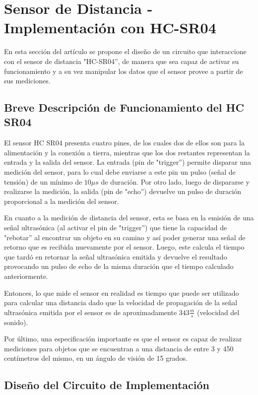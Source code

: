 \section{Sensor de Distancia - Implementación con HC-SR04}

En esta sección del artículo se propone el diseño de un circuito que
interaccione con el sensor de distancia "HC-SR04'', de manera que
sea capaz de activar su funcionamiento y a su vez manipular los datos
que el sensor provee a partir de sus mediciones. 

\subsection{Breve Descripción de Funcionamiento del HC SR04}

El sensor HC SR04 presenta cuatro pines, de los cuales dos de ellos
son para la alimentación y la conexión a tierra, mientras que los
dos restantes representan la entrada y la salida del sensor. La entrada
(pin de "trigger'') permite disparar una medición del sensor, para
lo cual debe enviarse a este pin un pulso (señal de tensión) de un
mínimo de $10\mu s$ de duración. Por otro lado, luego de dispararse
y realizarse la medición, la salida (pin de "echo'') devuelve un
pulso de duración proporcional a la medición del sensor.

En cuanto a la medición de distancia del sensor, esta se basa en la
emisión de una señal ultrasónica (al activar el pin de "trigger'')
que tiene la capacidad de "rebotar'' al encontrar un objeto en
su camino y así poder generar una señal de retorno que es recibida
nuevamente por el sensor. Luego, este calcula el tiempo que tardó
en retornar la señal ultrasónica emitida y devuelve el resultado
provocando un pulso de echo de la misma duración que el tiempo calculado
anteriormente.

Entonces, lo que mide el sensor en realidad es tiempo que puede ser
utilizado para calcular una distancia dado que la velocidad de propagación
de la señal ultrasónica emitida por el sensor es de aproximadamente
$343\frac{m}{s}$ (velocidad del sonido).

Por último, una especificación importante es que el sensor es capaz
de realizar mediciones para objetos que se encuentran a una distancia
de entre 3 y 450 centímetros del mismo, en un ángulo de visión de
15 grados.

\subsection{Diseño del Circuito de Implementación}

